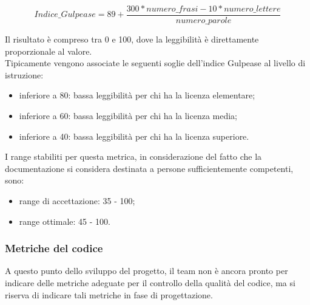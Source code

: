 			\begin{equation}\label{Indice Gulpease}
			Indice\_Gulpease = 89+ \frac{300*numero\_frasi-10*numero\_lettere}{numero\_parole}
			\end{equation}
				
			Il risultato è compreso tra 0 e 100, dove la leggibilità è direttamente proporzionale al valore.\\
			Tipicamente vengono associate le seguenti soglie dell'indice Gulpease al livello di istruzione:
			\begin{itemize}
				\item inferiore a 80: bassa leggibilità per chi ha la licenza elementare;
				\item inferiore a 60: bassa leggibilità per chi ha la licenza media;
				\item inferiore a 40: bassa leggibilità per chi ha la licenza superiore.
			\end{itemize}
			
			I range stabiliti per questa metrica, in considerazione del fatto che la documentazione si considera destinata a persone sufficientemente competenti, sono:
			\begin{itemize}
				\item range di accettazione: 35 - 100;
				\item range ottimale: 45 - 100.
			\end{itemize}
		\subsubsection{Metriche del codice}
			A questo punto dello sviluppo del progetto, il team non è ancora pronto per indicare delle metriche adeguate per il controllo della qualità del codice, ma si riserva di indicare tali metriche in fase di progettazione.
